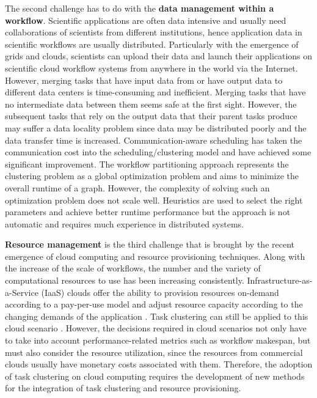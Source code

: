 The second challenge has to do with the \textbf{data management within a workflow}. Scientific applications are often data intensive and usually need collaborations of scientists from different institutions, hence application data in scientific workflows are usually distributed. Particularly with the emergence of grids and clouds, scientists can upload their data and launch their applications on scientific cloud workflow systems from anywhere in the world via the Internet. However, merging tasks that have input data from or have output data to different data centers is time-consuming and inefficient. Merging tasks that have no intermediate data between them seems safe at the first sight. However, the subsequent tasks that rely on the output data that their parent tasks produce may suffer a data locality problem since data may be distributed poorly and the data transfer time is increased. Communication-aware scheduling \cite{Sonmez2006, Jones2004} has taken the communication cost into the scheduling/clustering model and have achieved some significant improvement. The workflow partitioning approach \cite{Hedayat2009, Yuan2010, Wieczorek2005,Rubing2005} represents the clustering problem as a global optimization problem and aims to minimize the overall runtime of a graph. However, the complexity of solving such an optimization problem does not scale well. Heuristics \cite{Maheshwari2012, Callaghan2010} are used to select the right parameters and achieve better runtime performance but the approach is not automatic and requires much experience in distributed systems. 


\textbf{Resource management} is the third challenge that is brought by the recent emergence of cloud computing and resource provisioning techniques. Along with the increase of the scale of workflows, the number and the variety of computational resources to use has been increasing consistently. Infrastructure-as-a-Service (IaaS) clouds offer the ability to provision resources on-demand according to a pay-per-use model and adjust resource capacity according to the changing demands of the application \cite{Abrishami2012}. Task clustering can still be applied to this cloud scenario \cite{Deelman2010, Vockler2011}. However, the decisions required in cloud scenarios not only have to take into account performance-related metrics such as workﬂow makespan, but must also consider the resource utilization, since the resources from commercial clouds usually have monetary costs associated with them. Therefore, the adoption of task clustering on cloud computing requires the development of new methods for the integration of task clustering and resource provisioning. 

